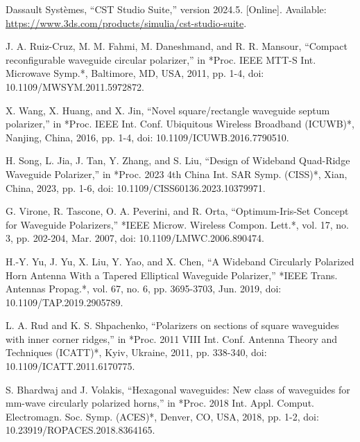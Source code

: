 \documentclass[conference,a4paper]{isap2025}
\begin{document}

\begin{thebibliography}{00}
Dassault Syst{\`e}mes, ``CST Studio Suite,'' version 2024.5. [Online]. Available: \url{https://www.3ds.com/products/simulia/cst-studio-suite}.

J. A. Ruiz-Cruz, M. M. Fahmi, M. Daneshmand, and R. R. Mansour, 
``Compact reconfigurable waveguide circular polarizer,''
in *Proc. IEEE MTT-S Int. Microwave Symp.*, Baltimore, MD, USA, 2011, pp. 1-4, 
doi: 10.1109/MWSYM.2011.5972872.

X. Wang, X. Huang, and X. Jin, 
``Novel square/rectangle waveguide septum polarizer,''
in *Proc. IEEE Int. Conf. Ubiquitous Wireless Broadband (ICUWB)*, Nanjing, China, 2016, pp. 1-4, 
doi: 10.1109/ICUWB.2016.7790510.

H. Song, L. Jia, J. Tan, Y. Zhang, and S. Liu, 
``Design of Wideband Quad-Ridge Waveguide Polarizer,''
in *Proc. 2023 4th China Int. SAR Symp. (CISS)*, Xian, China, 2023, pp. 1-6, 
doi: 10.1109/CISS60136.2023.10379971.

G. Virone, R. Tascone, O. A. Peverini, and R. Orta, 
``Optimum-Iris-Set Concept for Waveguide Polarizers,''
*IEEE Microw. Wireless Compon. Lett.*, vol. 17, no. 3, pp. 202-204, Mar. 2007, 
doi: 10.1109/LMWC.2006.890474.

H.-Y. Yu, J. Yu, X. Liu, Y. Yao, and X. Chen, 
``A Wideband Circularly Polarized Horn Antenna With a Tapered Elliptical Waveguide Polarizer,''
*IEEE Trans. Antennas Propag.*, vol. 67, no. 6, pp. 3695-3703, Jun. 2019, 
doi: 10.1109/TAP.2019.2905789.

L. A. Rud and K. S. Shpachenko, 
``Polarizers on sections of square waveguides with inner corner ridges,''
in *Proc. 2011 VIII Int. Conf. Antenna Theory and Techniques (ICATT)*, Kyiv, Ukraine, 2011, pp. 338-340, 
doi: 10.1109/ICATT.2011.6170775.

S. Bhardwaj and J. Volakis, 
``Hexagonal waveguides: New class of waveguides for mm-wave circularly polarized horns,''
in *Proc. 2018 Int. Appl. Comput. Electromagn. Soc. Symp. (ACES)*, Denver, CO, USA, 2018, pp. 1-2, 
doi: 10.23919/ROPACES.2018.8364165.


\end{thebibliography}
\end{document}
